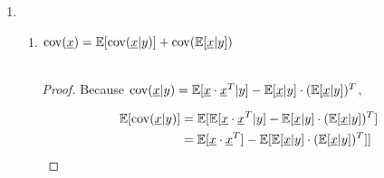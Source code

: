 \documentclass[a4paper]{article}
\begin{document}
\begin{enumerate}
\begin{enumerate}
\begin{enumerate}
\begin{proof}
      Because $\var (x|y) = \EX[(x-\EX[x|y])^2 |y] = \EX[x^2|y] - (\EX[x|y])^2$,

      \begin{equation}
        \begin{aligned}
          \EX[\var (x|y)]& = \EX[ \EX[x^2|y] - (\EX[x|y])^2] \\& = \EX[x^2] - \EX[(\EX[x|y])^2]
        \end{aligned}
      \end{equation}

      Meanwhile,

      \begin{equation}
        \begin{aligned}
          \var(\EX[x|y]) & = \EX [ (\EX[x|y])^2 ]- (\EX[\EX[x|y]])^2 \\
          & = \EX [ (\EX[x|y])^2 ]- (\EX[x])^2 
        \end{aligned}
      \end{equation}

    Therefore,

    \begin{equation}
      \begin{aligned}
        \EX[\var (x|y)] + \var(\EX[x|y]) = & \EX[x^2] - \EX[(\EX[x|y])^2] \\ 
         & + \EX [ (\EX[x|y])^2 ]- (\EX[x])^2 \\ = &\EX[x^2] - (\EX[x])^2 \\ =&\var(x)
      \end{aligned}
    \end{equation}
  \end{proof}
      \end{enumerate}

    \item \begin{enumerate}
      \item $\operatorname{cov}(\underline{x}) = \mathbb{E}[\operatorname{cov}(\underline{x}|y)]+ \operatorname{cov} (\mathbb{E}[\underline{x} | y])$
      \\~

      \begin{proof}
        
      Because $\operatorname{cov}(\underline{x} | y) = \mathbb{E} [\underline{x}\cdot\underline{x}^T | y ] - \mathbb{E}[\underline{x}|y] \cdot (\mathbb{E}[\underline{x}|y])^T$,

        \begin{equation}
          \begin{aligned}
            \mathbb{E}[\operatorname{cov}(\underline{x} | y)] &= \mathbb{E}[\mathbb{E} [\underline{x}\cdot\underline{x}^T | y ] - \mathbb{E}[\underline{x}|y] \cdot (\mathbb{E}[\underline{x}|y])^T] \\& = \mathbb{E} [\underline{x}\cdot\underline{x}^T] - \mathbb{E}[\mathbb{E}[\underline{x}|y] \cdot (\mathbb{E}[\underline{x}|y])^T]]
          \end{aligned}
        \end{equation}


\end{proof}
\end{enumerate}
\end{enumerate}
\end{enumerate}
\end{document}
